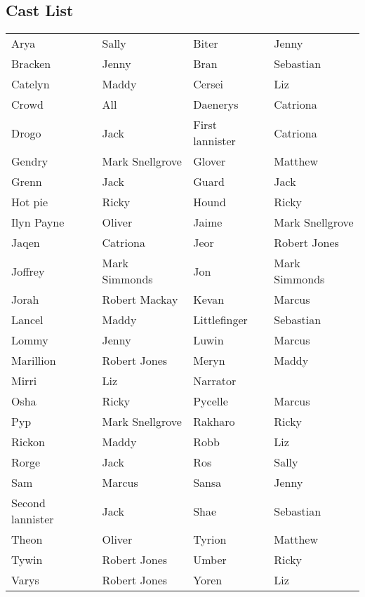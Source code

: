 \subsection*{Cast List}
\begin{tabular}{ll|ll}\\
Arya & Sally &  Biter & Jenny\\
Bracken & Jenny &  Bran & Sebastian\\
Catelyn & Maddy &  Cersei & Liz\\
Crowd & All &  Daenerys & Catriona\\
Drogo & Jack &  First lannister & Catriona\\
Gendry & Mark Snellgrove &  Glover & Matthew\\
Grenn & Jack &  Guard & Jack\\
Hot pie & Ricky &  Hound & Ricky\\
Ilyn Payne & Oliver &  Jaime & Mark Snellgrove\\
Jaqen & Catriona &  Jeor & Robert Jones\\
Joffrey & Mark Simmonds &  Jon & Mark Simmonds\\
Jorah & Robert Mackay &  Kevan & Marcus\\
Lancel & Maddy &  Littlefinger & Sebastian\\
Lommy & Jenny &  Luwin & Marcus\\
Marillion & Robert Jones &  Meryn & Maddy\\
Mirri & Liz &  Narrator & \\
Osha & Ricky &  Pycelle & Marcus\\
Pyp & Mark Snellgrove &  Rakharo & Ricky\\
Rickon & Maddy &  Robb & Liz\\
Rorge & Jack &  Ros & Sally\\
Sam & Marcus &  Sansa & Jenny\\
Second lannister & Jack &  Shae & Sebastian\\
Theon & Oliver &  Tyrion & Matthew\\
Tywin & Robert Jones &  Umber & Ricky\\
Varys & Robert Jones &  Yoren & Liz\\
\end{tabular}
